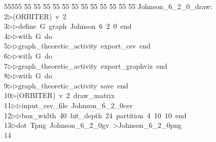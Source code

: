 %
%
\begin{tabbing}
55555 \= 55 \= 55 \= 55 \= 55 \= 55 \= 55 \= 55 \= 55 \= 55 \= 55 \= 55 \= 55 \= \>Johnson\_6\_2\_0\_draw:\\[0pt]
2\>$\triangleright$\>(ORBITER)\ v\ 2\ \\[0pt]
3\>$\triangleright$\>$\triangleright$\>define\ G\ graph\ Johnson\ 6\ 2\ 0\ end\ \\[0pt]
4\>$\triangleright$\>$\triangleright$\>with\ G\ do\ \\[0pt]
5\>$\triangleright$\>$\triangleright$\>graph\_theoretic\_activity\ export\_csv\ end\ \\[0pt]
6\>$\triangleright$\>$\triangleright$\>with\ G\ do\ \\[0pt]
7\>$\triangleright$\>$\triangleright$\>graph\_theoretic\_activity\ export\_graphviz\ end\ \\[0pt]
8\>$\triangleright$\>$\triangleright$\>with\ G\ do\ \\[0pt]
9\>$\triangleright$\>$\triangleright$\>graph\_theoretic\_activity\ save\ end\\[0pt]
10\>$\triangleright$\>(ORBITER)\ v\ 2\ draw\_matrix\ \\[0pt]
11\>$\triangleright$\>$\triangleright$\>input\_csv\_file\ Johnson\_6\_2\_0csv\ \\[0pt]
12\>$\triangleright$\>$\triangleright$\>box\_width\ 40\ bit\_depth\ 24\ partition\ 4\ 10\ 10\ end\\[0pt]
13\>$\triangleright$\>dot\ Tpng\ Johnson\_6\_2\_0gv\ {\textgreater}Johnson\_6\_2\_0png\\[0pt]
14\>\end{tabbing}
